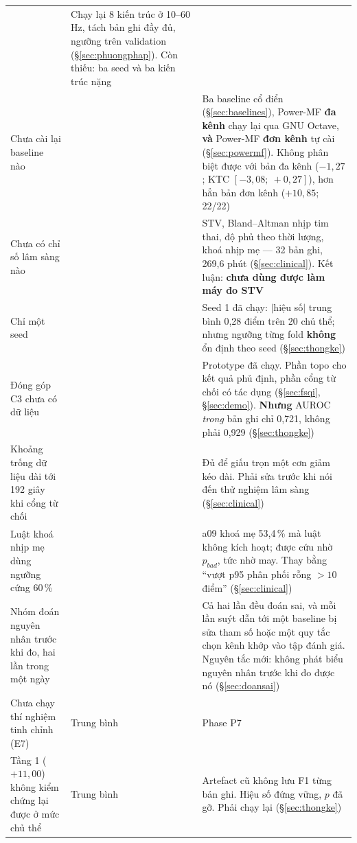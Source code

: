 \begin{table}[H]
\begin{tabular}{@{}L{5.6cm} C{1.9cm} L{6.8cm}@{}}
 & Chạy lại 8 kiến trúc ở 10--60\,Hz, tách bản ghi đầy đủ, ngưỡng trên validation
(\S\ref{sec:phuongphap}). Còn thiếu: ba seed và ba kiến trúc nặng \\
Chưa cài lại baseline nào &
 & Ba baseline cổ điển (\S\ref{sec:baselines}), Power-MF \textbf{đa kênh} chạy lại qua GNU
Octave, \textbf{và} Power-MF \textbf{đơn kênh} tự cài (\S\ref{sec:powermf}). Không phân biệt được với bản
đa kênh ($-1{,}27$; KTC $[-3{,}08;\ +0{,}27]$), hơn hẳn bản đơn kênh ($+10{,}85$; 22/22) \\
Chưa có chỉ số lâm sàng nào &
 & STV, Bland--Altman nhịp tim thai, độ phủ theo thời lượng, khoá nhịp mẹ ---
32 bản ghi, 269,6 phút (\S\ref{sec:clinical}). Kết luận: \textbf{chưa dùng được làm máy đo STV} \\
Chỉ một seed &  & Seed 1 đã chạy: $|$hiệu số$|$ trung bình 0,28 điểm trên 20 chủ thể;
nhưng ngưỡng từng fold \textbf{không} ổn định theo seed (\S\ref{sec:thongke}) \\
Đóng góp C3 chưa có dữ liệu &  & Prototype đã chạy. Phần topo cho kết quả phủ định, phần cổng
từ chối có tác dụng (\S\ref{sec:fsqi}, \S\ref{sec:demo}). \textbf{Nhưng} AUROC \textit{trong} bản ghi chỉ
0,721, không phải 0,929 (\S\ref{sec:thongke}) \\
Khoảng trống dữ liệu dài tới 192 giây khi cổng từ chối &
 & Đủ để giấu trọn một cơn giảm kéo dài. Phải sửa trước khi nói đến thử nghiệm lâm
sàng (\S\ref{sec:clinical}) \\
Luật khoá nhịp mẹ dùng ngưỡng cứng 60\,\% &
 & a09 khoá mẹ 53,4\,\% mà luật không kích hoạt; được cứu nhờ $p_{bad}$, tức nhờ may.
Thay bằng ``vượt p95 phân phối rỗng $>10$ điểm'' (\S\ref{sec:clinical}) \\
Nhóm đoán nguyên nhân trước khi đo, hai lần trong một ngày &
 & Cả hai lần đều đoán sai, và mỗi lần suýt dẫn tới một baseline bị sửa tham số hoặc
một quy tắc chọn kênh khớp vào tập đánh giá. Nguyên tắc mới: không phát biểu nguyên nhân trước khi đo
được nó (\S\ref{sec:doansai}) \\
Chưa chạy thí nghiệm tinh chỉnh (E7) & Trung bình & Phase P7 \\
Tầng 1 ($+11{,}00$) không kiểm chứng lại được ở mức chủ thể &
Trung bình & Artefact cũ không lưu F1 từng bản ghi. Hiệu số đứng vững, $p$ đã gỡ. Phải chạy lại
(\S\ref{sec:thongke}) \\
\bottomrule
\end{tabular}
\end{table}

